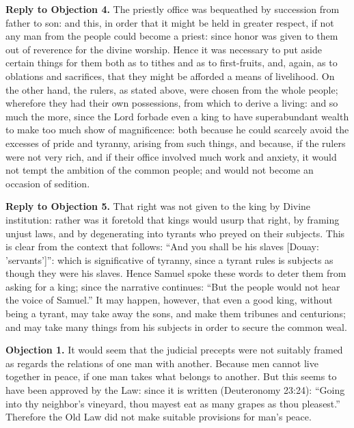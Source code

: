 \textbf{Reply to Objection 4.} The priestly office was bequeathed by succession from father to son: and this, in order that it might be held in greater respect, if not any man from the people could become a priest: since honor was given to them out of reverence for the divine worship. Hence it was necessary to put aside certain things for them both as to tithes and as to first-fruits, and, again, as to oblations and sacrifices, that they might be afforded a means of livelihood. On the other hand, the rulers, as stated above, were chosen from the whole people; wherefore they had their own possessions, from which to derive a living: and so much the more, since the Lord forbade even a king to have superabundant wealth to make too much show of magnificence: both because he could scarcely avoid the excesses of pride and tyranny, arising from such things, and because, if the rulers were not very rich, and if their office involved much work and anxiety, it would not tempt the ambition of the common people; and would not become an occasion of sedition.

\textbf{Reply to Objection 5.} That right was not given to the king by Divine institution: rather was it foretold that kings would usurp that right, by framing unjust laws, and by degenerating into tyrants who preyed on their subjects. This is clear from the context that follows: ``And you shall be his slaves [Douay: 'servants']'': which is significative of tyranny, since a tyrant rules is subjects as though they were his slaves. Hence Samuel spoke these words to deter them from asking for a king; since the narrative continues: ``But the people would not hear the voice of Samuel.'' It may happen, however, that even a good king, without being a tyrant, may take away the sons, and make them tribunes and centurions; and may take many things from his subjects in order to secure the common weal.


\textbf{Objection 1.} It would seem that the judicial precepts were not suitably framed as regards the relations of one man with another. Because men cannot live together in peace, if one man takes what belongs to another. But this seems to have been approved by the Law: since it is written (Deuteronomy 23:24): ``Going into thy neighbor's vineyard, thou mayest eat as many grapes as thou pleasest.'' Therefore the Old Law did not make suitable provisions for man's peace.

